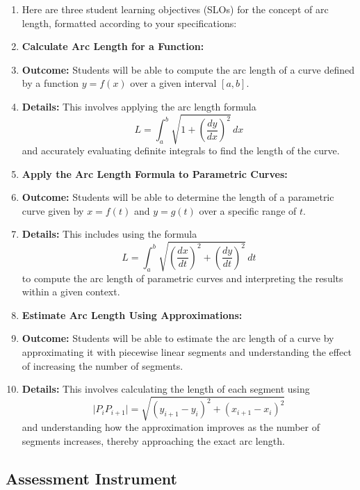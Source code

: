 \begin{enumerate}
    \item Here are three student learning objectives (SLOs) for the concept of arc length, formatted according to your specifications:
    \item \textbf{Calculate Arc Length for a Function:}
    \item \textbf{Outcome:} Students will be able to compute the arc length of a curve defined by a function $y = f(x)$ over a given interval $[a, b]$.
    \item \textbf{Details:} This involves applying the arc length formula $$L = \int_a^b \sqrt{1 + \left(\frac{dy}{dx}\right)^2} \, dx$$ and accurately evaluating definite integrals to find the length of the curve.
    \item \textbf{Apply the Arc Length Formula to Parametric Curves:}
    \item \textbf{Outcome:} Students will be able to determine the length of a parametric curve given by $x = f(t)$ and $y = g(t)$ over a specific range of $t$.
    \item \textbf{Details:} This includes using the formula $$L = \int_a^b \sqrt{\left(\frac{dx}{dt}\right)^2 + \left(\frac{dy}{dt}\right)^2} \, dt$$ to compute the arc length of parametric curves and interpreting the results within a given context.
    \item \textbf{Estimate Arc Length Using Approximations:}
    \item \textbf{Outcome:} Students will be able to estimate the arc length of a curve by approximating it with piecewise linear segments and understanding the effect of increasing the number of segments.
    \item \textbf{Details:} This involves calculating the length of each segment using $$\bigl|P_iP_{i+1}\bigr| = \sqrt{(y_{i+1} - y_i)^2 + (x_{i+1} - x_i)^2}$$ and understanding how the approximation improves as the number of segments increases, thereby approaching the exact arc length.
\end{enumerate}

\subsection{Assessment Instrument}

